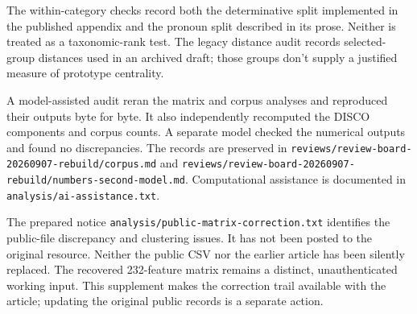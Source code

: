 \documentclass[12pt]{article}
\begin{document}
The within-category checks record both the determinative split implemented in the published appendix and the pronoun split described in its prose. Neither is treated as a taxonomic-rank test. The legacy distance audit records selected-group distances used in an archived draft; those groups don't supply a justified measure of prototype centrality.

A model-assisted audit reran the matrix and corpus analyses and reproduced their outputs byte for byte. It also independently recomputed the DISCO components and corpus counts. A separate model checked the numerical outputs and found no discrepancies. The records are preserved in \nolinkurl{reviews/review-board-20260907-rebuild/corpus.md} and \nolinkurl{reviews/review-board-20260907-rebuild/numbers-second-model.md}. Computational assistance is documented in \nolinkurl{analysis/ai-assistance.txt}.

The prepared notice \nolinkurl{analysis/public-matrix-correction.txt} identifies the public-file discrepancy and clustering issues. It has not been posted to the original resource. Neither the public CSV nor the earlier article has been silently replaced. The recovered 232-feature matrix remains a distinct, unauthenticated working input. This supplement makes the correction trail available with the article; updating the original public records is a separate action.

\printbibliography
\end{document}
